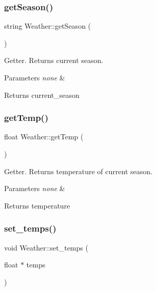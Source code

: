 \subsubsection{\texorpdfstring{get\+Season()}{getSeason()}}
{\footnotesize\ttfamily string Weather\+::get\+Season (\begin{DoxyParamCaption}{ }\end{DoxyParamCaption})}

Getter. Returns current season. 
\begin{DoxyParams}{Parameters}
{\em none} & \\
\hline
\end{DoxyParams}
\begin{DoxyReturn}{Returns}
current\+\_\+season 
\end{DoxyReturn}
\mbox{\label{class_weather_a35568e635e7b92edf85937fdab293d9d}} 
\subsubsection{\texorpdfstring{get\+Temp()}{getTemp()}}
{\footnotesize\ttfamily float Weather\+::get\+Temp (\begin{DoxyParamCaption}{ }\end{DoxyParamCaption})}

Getter. Returns temperature of current season. 
\begin{DoxyParams}{Parameters}
{\em none} & \\
\hline
\end{DoxyParams}
\begin{DoxyReturn}{Returns}
temperature 
\end{DoxyReturn}
\mbox{\label{class_weather_acd62160ebada5a9f7658f45042e44372}} 
\subsubsection{\texorpdfstring{set\+\_\+temps()}{set\_temps()}}
{\footnotesize\ttfamily void Weather\+::set\+\_\+temps (\begin{DoxyParamCaption}\item[{float $\ast$}]{temps }\end{DoxyParamCaption})}


